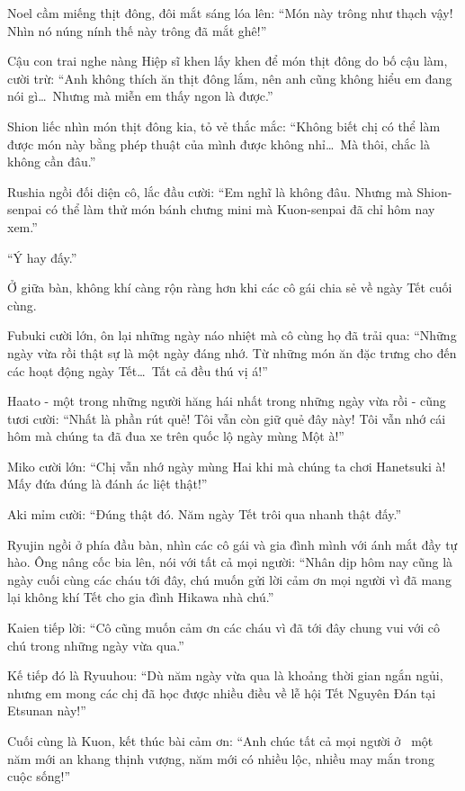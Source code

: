 \documentclass[../main.tex]{subfiles}
\begin{document}
Noel cầm miếng thịt đông, đôi mắt sáng lóa lên: ``Món này trông như thạch vậy! Nhìn nó núng nính thế này trông đã mắt ghê!''

Cậu con trai nghe nàng Hiệp sĩ khen lấy khen để món thịt đông do bố cậu làm, cười trừ: ``Anh không thích ăn thịt đông lắm, nên anh cũng không hiểu em đang nói gì\dots\ Nhưng mà miễn em thấy ngon là được.''

Shion liếc nhìn món thịt đông kia, tỏ vẻ thắc mắc: ``Không biết chị có thể làm được món này bằng phép thuật của mình được không nhỉ\dots\ Mà thôi, chắc là không cần đâu.''

Rushia ngồi đối diện cô, lắc đầu cười: ``Em nghĩ là không đâu. Nhưng mà Shion-senpai có thể làm thử món bánh chưng mini mà Kuon-senpai đã chỉ hôm nay xem.''

``Ý hay đấy.''

Ở giữa bàn, không khí càng rộn ràng hơn khi các cô gái chia sẻ về ngày Tết cuối cùng.

Fubuki cười lớn, ôn lại những ngày náo nhiệt mà cô cùng họ đã trải qua: ``Những ngày vừa rồi thật sự là một ngày đáng nhớ. Từ những món ăn đặc trưng cho đến các hoạt động ngày Tết\dots\ Tất cả đều thú vị á!''

Haato - một trong những người hăng hái nhất trong những ngày vừa rồi - cũng tươi cười: ``Nhất là phần rút quẻ! Tôi vẫn còn giữ quẻ đây này! Tôi vẫn nhớ cái hôm mà chúng ta đã đua xe trên quốc lộ ngày mùng Một à!''

Miko cười lớn: ``Chị vẫn nhớ ngày mùng Hai khi mà chúng ta chơi Hanetsuki à! Mấy đứa đúng là đánh ác liệt thật!''

Aki mỉm cười: ``Đúng thật đó. Năm ngày Tết trôi qua nhanh thật đấy.''

Ryujin ngồi ở phía đầu bàn, nhìn các cô gái và gia đình mình với ánh mắt đầy tự hào. Ông nâng cốc bia lên, nói với tất cả mọi người: ``Nhân dịp hôm nay cũng là ngày cuối cùng các cháu tới đây, chú muốn gửi lời cảm ơn mọi người vì đã mang lại không khí Tết cho gia đình Hikawa nhà chú.''

Kaien tiếp lời: ``Cô cũng muốn cảm ơn các cháu vì đã tới đây chung vui với cô chú trong những ngày vừa qua.''

Kế tiếp đó là Ryuuhou: ``Dù năm ngày vừa qua là khoảng thời gian ngắn ngủi, nhưng em mong các chị đã học được nhiều điều về lễ hội Tết Nguyên Đán tại Etsunan này!''

Cuối cùng là Kuon, kết thúc bài cảm ơn: ``Anh chúc tất cả mọi người ở \hll\ một năm mới an khang thịnh vượng, năm mới có nhiều lộc, nhiều may mắn trong cuộc sống!''
\end{document}
